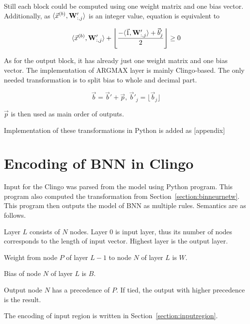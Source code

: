 \documentclass{fithesis}
\begin{document}
Still each block could be computed using one weight matrix and one bias vector.
Additionally, as $\langle\vec x^{(b)}, \mathbf{W}'_{:, j}\rangle$ is an integer value,
equation is equivalent to

\begin{equation}
    \langle \vec x^{(b)}, \mathbf{W}'_{:, j}\rangle + \left\lfloor \frac{- \langle\vec1, \mathbf{W}'_{:,j}\rangle + \vec b'_j}{2} \right\rfloor \geq 0\\
    \label{eq:layer_comp}
\end{equation}

As for the output block, it has already just one weight matrix and one bias
vector. The implementation of ARGMAX layer is mainly Clingo-based.
The only needed transformation is to split bias to whole and decimal part.

\begin{equation*}
    \vec b = \vec b' + \vec p, \, \vec b'_j = \lfloor \vec b_j \rfloor
\end{equation*}

$\vec p$ is then used as main order of outputs.

Implementation of these transformations in Python is added as [appendix] %

\section{Encoding of BNN in Clingo}

Input for the Clingo was parsed from the model using Python program. This
program also computed the transformation from Section~\ref{section:binneurnetw}.
This program then outputs the model of BNN as multiple rules.
Semantics are as follows.

Layer $L$ consists of $N$ nodes. Layer 0 is input layer, thus its number
of nodes corresponds to the length of input vector.
Highest layer is the output layer.

Weight from node $P$ of layer $L-1$ to node $N$ of layer $L$ is $W$.

Bias of node $N$ of layer $L$ is $B$.

Output node $N$ has a precedence of $P$. If tied, the output
with higher precedence is the result.

The encoding of input region is written in Section~\ref{section:inputregion}.
\end{document}
